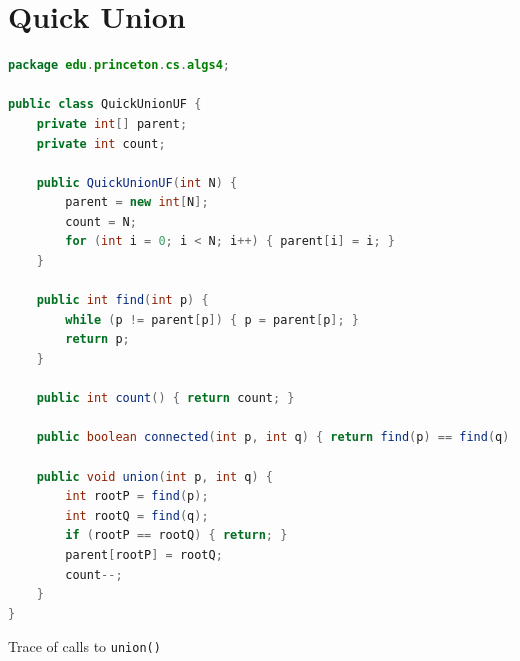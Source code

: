 \documentclass[8pt,a4paper,compress]{beamer}
\begin{document}
\section{Quick Union}
\begin{frame}[fragile]
\pause

\begin{lstlisting}[language=Java,style=focusin]
package edu.princeton.cs.algs4;

public class QuickUnionUF {
    private int[] parent;
    private int count;

    public QuickUnionUF(int N) {
        parent = new int[N];
        count = N;
        for (int i = 0; i < N; i++) { parent[i] = i; }
    }

    public int find(int p) {
        while (p != parent[p]) { p = parent[p]; }
        return p;
    }

    public int count() { return count; }
  
    public boolean connected(int p, int q) { return find(p) == find(q); }

    public void union(int p, int q) {
        int rootP = find(p);
        int rootQ = find(q);
        if (rootP == rootQ) { return; }
        parent[rootP] = rootQ; 
        count--;
    }
}
\end{lstlisting}
\end{frame}

\begin{frame}[fragile]
\pause

Trace of calls to \lstinline{union()}

\begin{center}
\end{center}
\end{frame}
\end{document}
